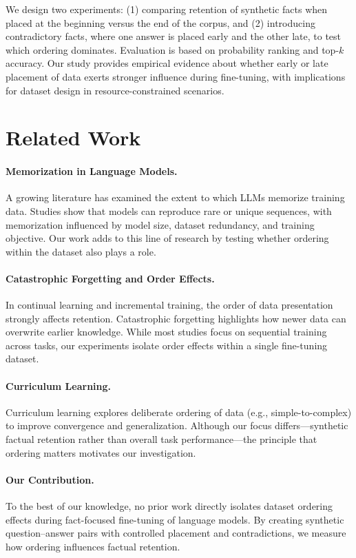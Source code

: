\documentclass[11pt]{article}
\begin{document}
We design two experiments: (1) comparing retention of synthetic facts when placed at the beginning versus the end of the corpus, and (2) introducing contradictory facts, where one answer is placed early and the other late, to test which ordering dominates. Evaluation is based on probability ranking and top-$k$ accuracy. Our study provides empirical evidence about whether early or late placement of data exerts stronger influence during fine-tuning, with implications for dataset design in resource-constrained scenarios.

\section{Related Work}

\paragraph{Memorization in Language Models.}
A growing literature has examined the extent to which LLMs memorize training data. Studies show that models can reproduce rare or unique sequences, with memorization influenced by model size, dataset redundancy, and training objective. Our work adds to this line of research by testing whether ordering within the dataset also plays a role.

\paragraph{Catastrophic Forgetting and Order Effects.}
In continual learning and incremental training, the order of data presentation strongly affects retention. Catastrophic forgetting highlights how newer data can overwrite earlier knowledge. While most studies focus on sequential training across tasks, our experiments isolate order effects within a single fine-tuning dataset.

\paragraph{Curriculum Learning.}
Curriculum learning explores deliberate ordering of data (e.g., simple-to-complex) to improve convergence and generalization. Although our focus differs—synthetic factual retention rather than overall task performance—the principle that ordering matters motivates our investigation.

\paragraph{Our Contribution.}
To the best of our knowledge, no prior work directly isolates dataset ordering effects during fact-focused fine-tuning of language models. By creating synthetic question–answer pairs with controlled placement and contradictions, we measure how ordering influences factual retention.
\end{document}
